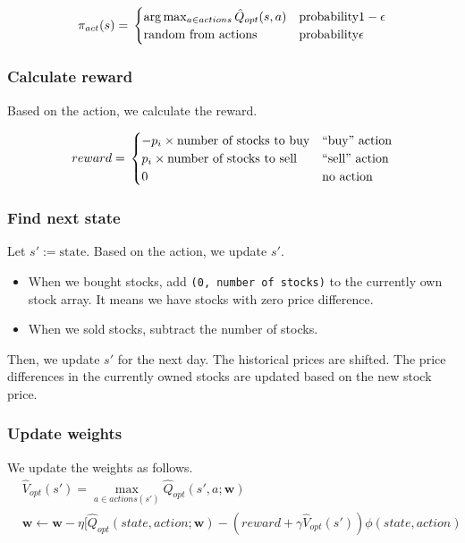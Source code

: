 \documentclass[12pt]{article}
\newcommand{\vect}[1]{\boldsymbol{#1}}
\begin{document}
\[
  \pi_{act}(s) = \\
  \begin{cases}
    \arg \max_{a \in actions}\hat{Q}_{opt}(s, a) & \text{probability} 1-\epsilon \\
    \text{random from actions} & \text{probability} \epsilon \\
  \end{cases}
\]

\subsubsection*{Calculate reward}

Based on the action, we calculate the reward.

\[
  reward = \\
  \begin{cases}
    -p_i \times \text{number of stocks to buy} & \text{``buy'' action} \\
    p_i \times \text{number of stocks to sell} & \text{``sell'' action} \\
    0 & \text{no action} \\
  \end{cases}
\]

\subsubsection*{Find next state}

Let $s' := \text{state}$. Based on the action, we update $s'$.

\begin{itemize}
\item When we bought stocks, add \verb|(0, number of stocks)| to
  the currently own stock array. It means we have stocks with zero
  price difference.
  \item When we sold stocks, subtract the number of stocks.
\end{itemize}

Then, we update $s'$ for the next day. The historical prices are
shifted. The price differences in the currently owned stocks are
updated based on the new stock price.

\subsubsection*{Update weights}

We update the weights as follows.
\begin{align*}
&\hat{V}_{opt}(s') = \max_{a \in actions(s')}\hat{Q}_{opt}(s', a;\vect{w}) \\
&\vect{w} \leftarrow \vect{w} - \eta[\hat{Q}_{opt}(state, action;\vect{w}) - (reward + \gamma \hat{V}_{opt}(s'))\phi(state,action)
\end{align*}
\end{document}
